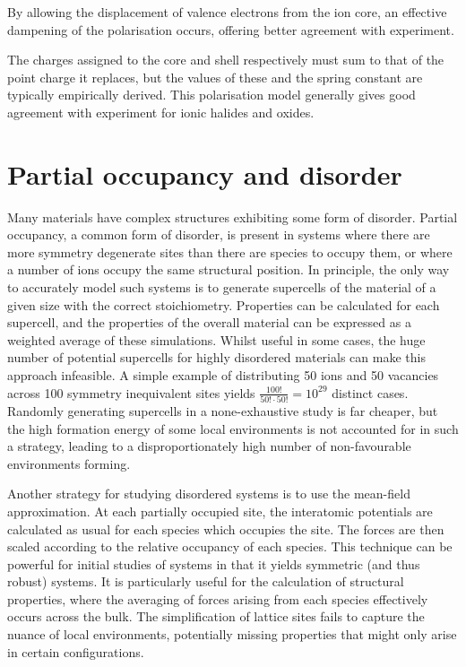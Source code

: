By allowing the displacement of valence electrons from the ion core, an effective dampening of the polarisation occurs, offering better agreement with experiment.

The charges assigned to the core and shell respectively must sum to that of the point charge it replaces, but the values of these and the spring constant are typically empirically derived.
This polarisation model generally gives good agreement with experiment for ionic halides and oxides.

\section{Partial occupancy and disorder}
Many materials have complex structures exhibiting some form of disorder.
Partial occupancy, a common form of disorder, is present in systems where there are more symmetry degenerate sites than there are species to occupy them, or where a number of ions occupy the same structural position.\cite{Gale2003}
In principle, the only way to accurately model such systems is to generate supercells of the material of a given size with the correct stoichiometry.
Properties can be calculated for each supercell, and the properties of the overall material can be expressed as a weighted average of these simulations.
Whilst useful in some cases, the huge number of potential supercells for highly disordered materials can make this approach infeasible.
A simple example of distributing 50 ions and 50 vacancies across 100 symmetry inequivalent sites yields $\frac{100!}{50!\cdot50!} = 10^{29}$ distinct cases.
Randomly generating supercells in a none-exhaustive study is far cheaper, but the high formation energy of some local environments is not accounted for in such a strategy, leading to a disproportionately high number of non-favourable environments forming.

Another strategy for studying disordered systems is to use the mean-field approximation. 
At each partially occupied site, the interatomic potentials are calculated as usual for each species which occupies the site. 
The forces are then scaled according to the relative occupancy of each species.
This technique can be powerful for initial studies of systems in that it yields symmetric (and thus robust) systems.
It is particularly useful for the calculation of structural properties, where the averaging of forces arising from each species effectively occurs across the bulk.
The simplification of lattice sites fails to capture the nuance of local environments, potentially missing properties that might only arise in certain configurations.

